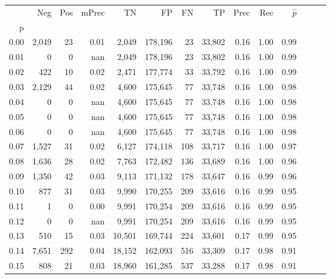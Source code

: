 \begin{tabular}{rrrrrrrrrrrrrr}
\toprule
{} &     Neg &    Pos & mPrec &       TN &       FP &      FN &      TP &  Prec &   Rec & $\hat{p}$ \\
p    &         &        &       &          &          &         &         &       &       &           \\
\midrule
0.00 &   2,049 &     23 &  0.01 &    2,049 &  178,196 &      23 &  33,802 &  0.16 &  1.00 &      0.99 \\
0.01 &       0 &      0 &   nan &    2,049 &  178,196 &      23 &  33,802 &  0.16 &  1.00 &      0.99 \\
0.02 &     422 &     10 &  0.02 &    2,471 &  177,774 &      33 &  33,792 &  0.16 &  1.00 &      0.99 \\
0.03 &   2,129 &     44 &  0.02 &    4,600 &  175,645 &      77 &  33,748 &  0.16 &  1.00 &      0.98 \\
0.04 &       0 &      0 &   nan &    4,600 &  175,645 &      77 &  33,748 &  0.16 &  1.00 &      0.98 \\
0.05 &       0 &      0 &   nan &    4,600 &  175,645 &      77 &  33,748 &  0.16 &  1.00 &      0.98 \\
0.06 &       0 &      0 &   nan &    4,600 &  175,645 &      77 &  33,748 &  0.16 &  1.00 &      0.98 \\
0.07 &   1,527 &     31 &  0.02 &    6,127 &  174,118 &     108 &  33,717 &  0.16 &  1.00 &      0.97 \\
0.08 &   1,636 &     28 &  0.02 &    7,763 &  172,482 &     136 &  33,689 &  0.16 &  1.00 &      0.96 \\
0.09 &   1,350 &     42 &  0.03 &    9,113 &  171,132 &     178 &  33,647 &  0.16 &  0.99 &      0.96 \\
0.10 &     877 &     31 &  0.03 &    9,990 &  170,255 &     209 &  33,616 &  0.16 &  0.99 &      0.95 \\
0.11 &       1 &      0 &  0.00 &    9,991 &  170,254 &     209 &  33,616 &  0.16 &  0.99 &      0.95 \\
0.12 &       0 &      0 &   nan &    9,991 &  170,254 &     209 &  33,616 &  0.16 &  0.99 &      0.95 \\
0.13 &     510 &     15 &  0.03 &   10,501 &  169,744 &     224 &  33,601 &  0.17 &  0.99 &      0.95 \\
0.14 &   7,651 &    292 &  0.04 &   18,152 &  162,093 &     516 &  33,309 &  0.17 &  0.98 &      0.91 \\
0.15 &     808 &     21 &  0.03 &   18,960 &  161,285 &     537 &  33,288 &  0.17 &  0.98 &      0.91 \\

\end{tabular}
